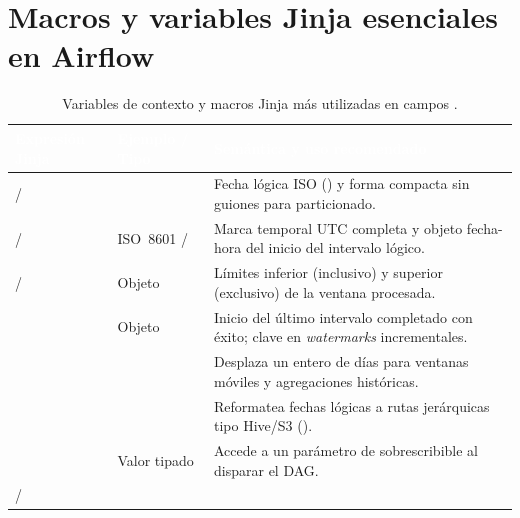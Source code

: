 \section{Macros y variables Jinja esenciales en Airflow}\label{sec:cheat-jinja}

\begin{table}[htbp]
\centering
\caption{Variables de contexto y macros Jinja más utilizadas en campos .}
\label{tab:cheat-jinja}
\scriptsize
\renewcommand{\arraystretch}{1.12}
\begin{tabularx}{\textwidth}{@{}L{5.5cm} L{2.7cm} Y@{}}
\toprule
{}
\textcolor{white}{\sffamily\bfseries Expresión Jinja} &
\textcolor{white}{\sffamily\bfseries Ejemplo / Tipo} &
\textcolor{white}{\sffamily\bfseries Semántica y uso recomendado} \\
\midrule
{} /  &
 &
Fecha lógica ISO () y forma compacta sin guiones para particionado. \\
 /  &
ISO~8601 /  &
Marca temporal UTC completa y objeto fecha-hora del inicio del intervalo lógico. \\
 /  &
Objeto  &
Límites inferior (inclusivo) y superior (exclusivo) de la ventana procesada. \\
 &
Objeto  &
Inicio del último intervalo completado con éxito; clave en \textit{watermarks} incrementales. \\
 &
 &
Desplaza  un entero de días para ventanas móviles y agregaciones históricas. \\
 &
 &
Reformatea fechas lógicas a rutas jerárquicas tipo Hive/S3 (). \\
 &
Valor tipado &
Accede a un parámetro de  sobrescribible al disparar el DAG. \\
 /  &

\end{tabularx}
\end{table}
